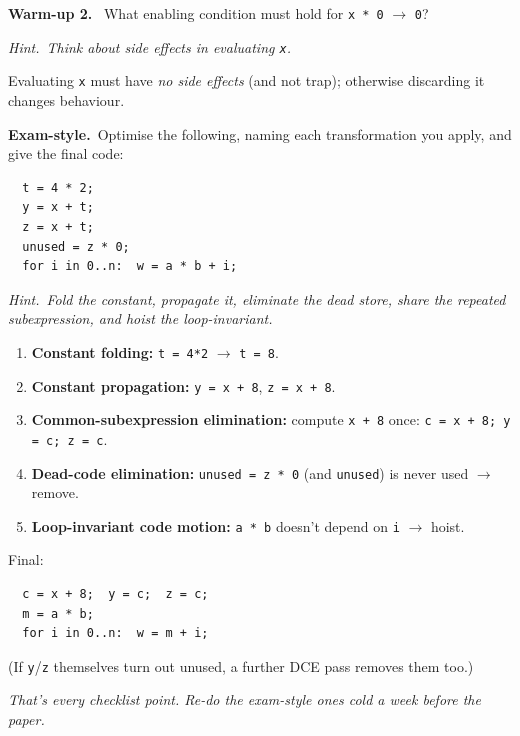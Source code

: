 \documentclass[11pt,a4paper]{article}
\newcommand{\hint}[1]{\par{\small\textcolor{accent}{\textit{Hint.}}\ \textit{#1}}\par\smallskip}
\newcommand{\warm}[1]{\smallskip\textbf{\textcolor{hi}{Warm-up #1.}}\ }
\newcommand{\exam}{\smallskip\textbf{\textcolor{warn}{Exam-style.}}\ }
\begin{document}
\warm{2} What enabling condition must hold for \texttt{x * 0} $\to$ \texttt{0}?
\hint{Think about side effects in evaluating \texttt{x}.}
\begin{sol}
Evaluating \texttt{x} must have \emph{no side effects} (and not trap); otherwise discarding it changes behaviour.
\end{sol}

\exam Optimise the following, naming each transformation you apply, and give the final code:
\begin{verbatim}
  t = 4 * 2;
  y = x + t;
  z = x + t;
  unused = z * 0;
  for i in 0..n:  w = a * b + i;
\end{verbatim}
\hint{Fold the constant, propagate it, eliminate the dead store, share the repeated subexpression, and hoist the loop-invariant.}
\begin{sol}
\begin{enumerate}[leftmargin=*,itemsep=0pt]
  \item \textbf{Constant folding:} \texttt{t = 4*2} $\to$ \texttt{t = 8}.
  \item \textbf{Constant propagation:} \texttt{y = x + 8}, \texttt{z = x + 8}.
  \item \textbf{Common-subexpression elimination:} compute \texttt{x + 8} once: \texttt{c = x + 8; y = c; z = c}.
  \item \textbf{Dead-code elimination:} \texttt{unused = z * 0} (and \texttt{unused}) is never used $\to$ remove.
  \item \textbf{Loop-invariant code motion:} \texttt{a * b} doesn't depend on \texttt{i} $\to$ hoist.
\end{enumerate}
Final:
\begin{verbatim}
  c = x + 8;  y = c;  z = c;
  m = a * b;
  for i in 0..n:  w = m + i;
\end{verbatim}
(If \texttt{y}/\texttt{z} themselves turn out unused, a further DCE pass removes them too.)
\end{sol}

\vspace{0.4cm}
\begin{center}\textit{That's every checklist point. Re-do the exam-style ones cold a week before the paper.}\end{center}
\end{document}
